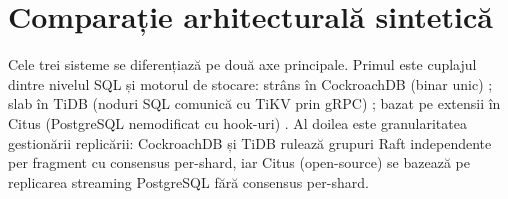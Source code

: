 \section{Comparație arhitecturală sintetică}

Cele trei sisteme se diferențiază pe două axe principale. Primul este cuplajul dintre nivelul SQL și motorul de stocare: strâns în CockroachDB (binar unic) \cite{taftcrdb2020}; slab în TiDB (noduri SQL comunică cu TiKV prin gRPC) \cite{huangtidb2020}; bazat pe extensii în Citus (PostgreSQL nemodificat cu hook-uri) \cite{cubukcucitus2021}. Al doilea este granularitatea gestionării replicării: CockroachDB și TiDB rulează grupuri Raft independente per fragment cu consensus per-shard, iar Citus (open-source) se bazează pe replicarea streaming PostgreSQL fără consensus per-shard.
